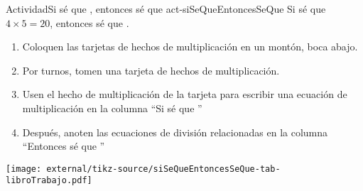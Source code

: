 \documentclass[14pt]{extarticle}
\begin{document}
\begin{activity}{Actividad}{Si sé que \textellipsis, entonces sé que \textellipsis}{act-siSeQueEntoncesSeQue}%
Si sé que \(4 \times 5 = 20\), entonces sé que .%
%
\begin{enumerate}
\item{}Coloquen las tarjetas de hechos de multiplicación en un montón, boca abajo.%
\item{}Por turnos, tomen una tarjeta de hechos de multiplicación.%
\item{}Usen el hecho de multiplicación de la tarjeta para escribir una ecuación de multiplicación en la columna “Si sé que \textellipsis{}”%
\item{}Después, anoten las ecuaciones de división relacionadas en la columna “Entonces sé que   \textellipsis{}”%
\end{enumerate}
\begin{image}{0}{1}{0}{}%
\texttt{[image: external/tikz-source/siSeQueEntoncesSeQue-tab-libroTrabajo.pdf]}
\end{image}%
\end{activity}
\end{document}
